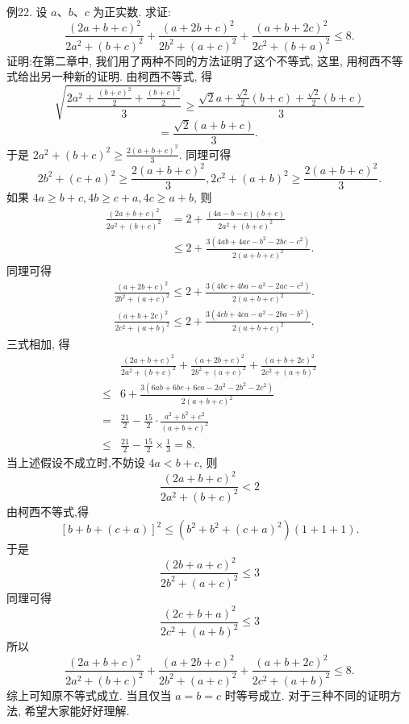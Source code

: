 例22. 设 $a 、 b 、 c$ 为正实数.
求证:
$$
\frac{(2 a+b+c)^2}{2 a^2+(b+c)^2}+\frac{(a+2 b+c)^2}{2 b^2+(a+c)^2}+\frac{(a+b+2 c)^2}{2 c^2+(b+a)^2} \leqslant 8 .
$$
证明:在第二章中, 我们用了两种不同的方法证明了这个不等式, 这里, 用柯西不等式给出另一种新的证明.
由柯西不等式, 得
$$
\sqrt{\frac{2 a^2+\frac{(b+c)^2}{2}+\frac{(b+c)^2}{2}}{3}} \geqslant \frac{\sqrt{2} a+\frac{\sqrt{2}}{2}(b+c)+\frac{\sqrt{2}}{2}(b+c)}{3}
$$
$$
=\frac{\sqrt{2}(a+b+c)}{3} \text {. }
$$
于是 $2 a^2+(b+c)^2 \geqslant \frac{2(a+b+c)^2}{3}$. 同理可得
$$
2 b^2+(c+a)^2 \geqslant \frac{2(a+b+c)^2}{3}, 2 c^2+(a+b)^2 \geqslant \frac{2(a+b+c)^2}{3} .
$$
如果 $4 a \geqslant b+c, 4 b \geqslant c+a, 4 c \geqslant a+b$, 则
$$
\begin{aligned}
\frac{(2 a+b+c)^2}{2 a^2+(b+c)^2} & =2+\frac{(4 a-b-c)(b+c)}{2 a^2+(b+c)^2} \\
& \leqslant 2+\frac{3\left(4 a b+4 a c-b^2-2 b c-c^2\right)}{2(a+b+c)^2} .
\end{aligned}
$$
同理可得
$$
\begin{aligned}
& \frac{(a+2 b+c)^2}{2 b^2+(a+c)^2} \leqslant 2+\frac{3\left(4 b c+4 b a-a^2-2 a c-c^2\right)}{2(a+b+c)^2} . \\
& \frac{(a+b+2 c)^2}{2 c^2+(a+b)^2} \leqslant 2+\frac{3\left(4 c b+4 c a-a^2-2 b a-b^2\right)}{2(a+b+c)^2} .
\end{aligned}
$$
三式相加, 得
$$
\begin{aligned}
& \frac{(2 a+b+c)^2}{2 a^2+(b+c)^2}+\frac{(a+2 b+c)^2}{2 b^2+(a+c)^2}+\frac{(a+b+2 c)^2}{2 c^2+(a+b)^2} \\
\leqslant & 6+\frac{3\left(6 a b+6 b c+6 c a-2 a^2-2 b^2-2 c^2\right)}{2(a+b+c)^2} \\
= & \frac{21}{2}-\frac{15}{2} \cdot \frac{a^2+b^2+c^2}{(a+b+c)^2} \\
\leqslant & \frac{21}{2}-\frac{15}{2} \times \frac{1}{3}=8 .
\end{aligned}
$$
当上述假设不成立时,不妨设 $4 a<b+c$, 则
$$
\frac{(2 a+b+c)^2}{2 a^2+(b+c)^2}<2
$$
由柯西不等式,得
$$
[b+b+(c+a)]^2 \leqslant\left(b^2+b^2+(c+a)^2\right)(1+1+1) .
$$
于是
$$
\frac{(2 b+a+c)^2}{2 b^2+(a+c)^2} \leqslant 3
$$
同理可得
$$
\frac{(2 c+b+a)^2}{2 c^2+(a+b)^2} \leqslant 3
$$
所以
$$
\frac{(2 a+b+c)^2}{2 a^2+(b+c)^2}+\frac{(a+2 b+c)^2}{2 b^2+(a+c)^2}+\frac{(a+b+2 c)^2}{2 c^2+(a+b)^2} \leqslant 8 .
$$
综上可知原不等式成立.
当且仅当 $a=b=c$ 时等号成立.
对于三种不同的证明方法, 希望大家能好好理解.



